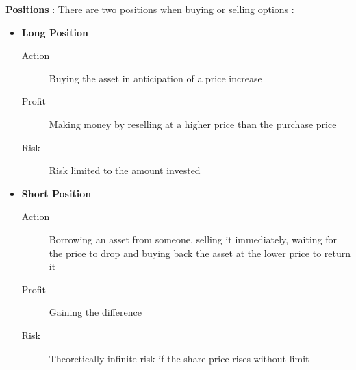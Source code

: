 \underline{\textbf{Positions}} : There are two positions when buying or selling options : \\
\begin{itemize}
    \item \textbf{Long Position}
    \begin{description}
        \item[Action] Buying the asset in anticipation of a price increase
        \item[Profit] Making money by reselling at a higher price than the purchase price
        \item[Risk] Risk limited to the amount invested
    \end{description}
    \item \textbf{Short Position}
    \begin{description}
        \item[Action] Borrowing an asset from someone, selling it immediately, waiting for the price to drop and buying back the asset at the lower price to return it
        \item[Profit] Gaining the difference
        \item[Risk] Theoretically infinite risk if the share price rises without limit
    \end{description}
\end{itemize}
